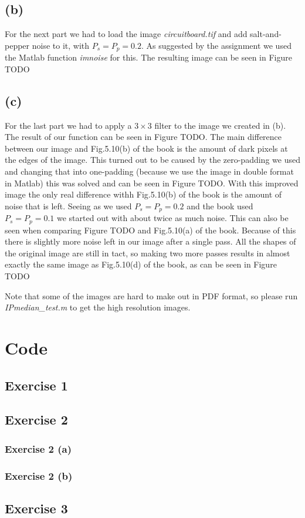 \documentclass{article}
\begin{document}
\subsection*{(b)}
For the next part we had to load the image \textit{circuitboard.tif} and add salt-and-pepper noise to it, with $P_s = P_p = 0.2$. As suggested by the assignment we used the Matlab function \textit{imnoise} for this. The resulting image can be seen in Figure TODO


\subsection*{(c)}
For the last part we had to apply a $3 \times 3$ filter to the image we created in (b). The result of our function can be seen in Figure TODO. The main difference between our image and Fig.5.10(b) of the book is the amount of dark pixels at the edges of the image. This turned out to be caused by the zero-padding we used and changing that into one-padding (because we use the image in double format in Matlab) this was solved and can be seen in Figure TODO. With this improved image the only real difference withh Fig.5.10(b) of the book is the amount of noise that is left. Seeing as we used $P_s = P_p = 0.2$ and the book used $P_s = P_p = 0.1$ we started out with about twice as much noise. This can also be seen when comparing Figure TODO and Fig.5.10(a) of the book. Because of this there is slightly more noise left in our image after a single pass. All the shapes of the original image are still in tact, so making two more passes results in almost exactly the same image as Fig.5.10(d) of the book, as can be seen in Figure TODO

Note that some of the images are hard to make out in PDF format, so please run \textit{IPmedian_test.m} to get the high resolution images.


\typeout{}


\appendix
\section{Code}
\subsection{Exercise 1}
\subsection{Exercise 2}
\subsubsection{Exercise 2 (a)}


\subsubsection{Exercise 2 (b)}

\subsection{Exercise 3}

\end{document}

